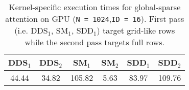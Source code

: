 \begin{table}[t]
\small
\centering
\renewcommand{\arraystretch}{1.2}
\setlength{\tabcolsep}{7.0pt}
\begin{tabular}{||c c |c c | c c||}
\hline
DDS$_1$ & DDS$_2$ & SM$_1$ & SM$_2$& SDD$_1$ & SDD$_2$\\
\hline\hline
44.44 & 34.82 &105.82 & 5.63 & 83.97 &	109.76\\

\hline
\end{tabular}
\caption{Kernel-specific execution times for global-sparse attention on GPU (\texttt{N = 1024},\texttt{ID = 16}). First pass (i.e. DDS$_1$, SM$_1$, SDD$_1$) target grid-like rows while the second pass targets full rows.}
\label{table:globalid}
\end{table}